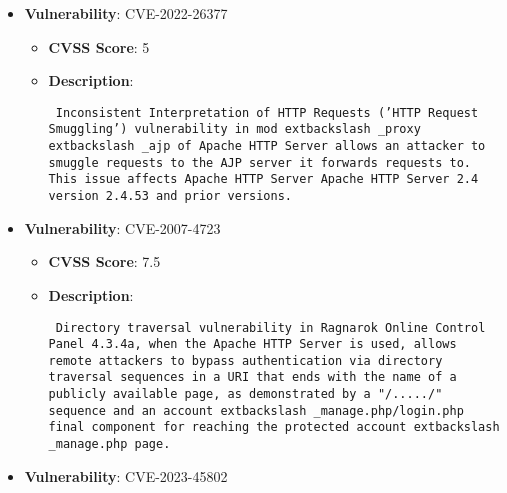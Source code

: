 \documentclass{article}
\begin{document}
\begin{itemize}
        \item \textbf{Vulnerability}: CVE-2022-26377
        \begin{itemize}
            \item \textbf{CVSS Score}:  5 
            \item \textbf{Description}: \parbox{\linewidth}{\texttt{ Inconsistent Interpretation of HTTP Requests ('HTTP Request Smuggling') vulnerability in mod	extbackslash _proxy	extbackslash _ajp of Apache HTTP Server allows an attacker to smuggle requests to the AJP server it forwards requests to. This issue affects Apache HTTP Server Apache HTTP Server 2.4 version 2.4.53 and prior versions. }}
        \end{itemize}
    
        \item \textbf{Vulnerability}: CVE-2007-4723
        \begin{itemize}
            \item \textbf{CVSS Score}:  7.5 
            \item \textbf{Description}: \parbox{\linewidth}{\texttt{ Directory traversal vulnerability in Ragnarok Online Control Panel 4.3.4a, when the Apache HTTP Server is used, allows remote attackers to bypass authentication via directory traversal sequences in a URI that ends with the name of a publicly available page, as demonstrated by a "/...../" sequence and an account	extbackslash _manage.php/login.php final component for reaching the protected account	extbackslash _manage.php page. }}
        \end{itemize}
    
        \item \textbf{Vulnerability}: CVE-2023-45802
\end{itemize}
\end{document}
